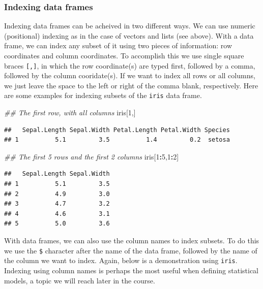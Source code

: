 \documentclass[]{book}
\newenvironment{Shaded}{\begin{snugshade}}{\end{snugshade}}
\newcommand{\CommentTok}[1]{\textcolor[rgb]{0.56,0.35,0.01}{\textit{#1}}}
\newcommand{\DecValTok}[1]{\textcolor[rgb]{0.00,0.00,0.81}{#1}}
\newcommand{\NormalTok}[1]{#1}
\newcommand{\OperatorTok}[1]{\textcolor[rgb]{0.81,0.36,0.00}{\textbf{#1}}}
\begin{document}
\hypertarget{indexing-data-frames}{%
\subsubsection{Indexing data frames}\label{indexing-data-frames}}

Indexing data frames can be acheived in two different ways. We can use numeric (positional) indexing as in the case of vectors and lists (see above). With a data frame, we can index any subset of it using two pieces of information: row coordinates and column coordinates. To accomplish this we use single square braces \texttt{{[},{]}}, in which the row coordinate(s) are typed first, followed by a comma, followed by the column cooridate(s). If we want to index all rows or all columns, we just leave the space to the left or right of the comma blank, respectively. Here are some examples for indexing subsets of the \texttt{iris} data frame.

\begin{Shaded}
\begin{Highlighting}[]
\CommentTok{## The first row, with all columns}
\NormalTok{iris[}\DecValTok{1}\NormalTok{,]}
\end{Highlighting}
\end{Shaded}

\begin{verbatim}
##   Sepal.Length Sepal.Width Petal.Length Petal.Width Species
## 1          5.1         3.5          1.4         0.2  setosa
\end{verbatim}

\begin{Shaded}
\begin{Highlighting}[]
\CommentTok{## The first 5 rows and the first 2 columns}
\NormalTok{iris[}\DecValTok{1}\OperatorTok{:}\DecValTok{5}\NormalTok{,}\DecValTok{1}\OperatorTok{:}\DecValTok{2}\NormalTok{]}
\end{Highlighting}
\end{Shaded}

\begin{verbatim}
##   Sepal.Length Sepal.Width
## 1          5.1         3.5
## 2          4.9         3.0
## 3          4.7         3.2
## 4          4.6         3.1
## 5          5.0         3.6
\end{verbatim}

With data frames, we can also use the column names to index subsets. To do this we use the \texttt{\$} character after the name of the data frame, followed by the name of the column we want to index. Again, below is a demonstration using \texttt{iris}. Indexing using column names is perhaps the most useful when defining statistical models, a topic we will reach later in the course.
\end{document}
